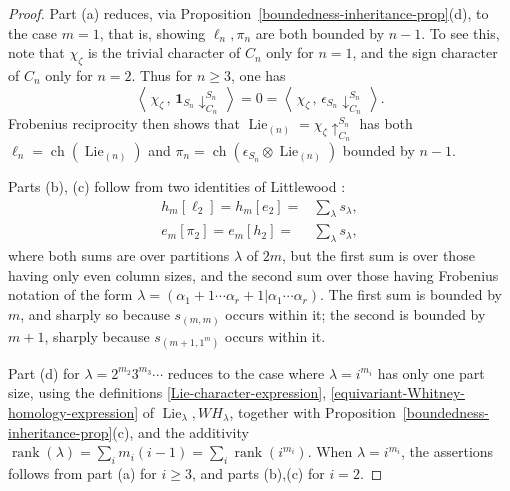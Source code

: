 \documentclass[12pt]{amsart}
\theoremstyle{plain}
\theoremstyle{definition}
\begin{document}
\begin{proof}
Part (a) reduces, via Proposition~\ref{boundedness-inheritance-prop}(d),
to the case $m=1$, that is, showing $\ell_n, \pi_n$ are both bounded by $n-1$.  
To see this, note that $\chi_\zeta$ is the trivial character of $C_n$ only for $n=1$,
and the sign character of $C_n$ only for $n=2$.
Thus for  $n \geq 3$, one has
$$
\left\langle \, \chi_\zeta \, , \, {{\mathbf{1}}}_{S_n} \downarrow^{S_n}_{C_n} \, \right\rangle
= 0 
=\left\langle \, \chi_\zeta \, , \, \epsilon_{S_n} \downarrow^{S_n}_{C_n} \, \right\rangle.
$$
Frobenius reciprocity then shows that
${{\operatorname{Lie}}}_{(n)}= \chi_\zeta \uparrow_{C_n}^{S_n}$
has both $\ell_n={{\operatorname{ch}}}({{\operatorname{Lie}}}_{(n)})$ 
and $\pi_n={{\operatorname{ch}}}(\epsilon_{S_n} \otimes {{\operatorname{Lie}}}_{(n)})$
bounded by $n-1$.

Parts (b), (c) follow from two identities of Littlewood
\cite[Exercise 7.28(c), 7.29(b)]{Stanley}:
\begin{align}
\label{first-Littlewood-plethysm}
h_m[\ell_2]=h_m[e_2]=&\sum_\lambda s_\lambda,\\
\label{second-Littlewood-plethysm}
e_m[\pi_2]=e_m[h_2]=&\sum_\lambda s_\lambda,
\end{align}
where both sums are over partitions $\lambda$ of $2m$, 
but the first sum is over those having only even column sizes,
and the second sum over those having Frobenius notation of
the form 
$\lambda=(\alpha_1+1 \cdots \alpha_r+1 |  \alpha_1 \cdots \alpha_r).$
The first sum is bounded by $m$, and sharply so because
$s_{(m,m)}$ occurs within it; the second is bounded by $m+1$, 
sharply because $s_{(m+1,1^m)}$ occurs within it.

Part (d) for 
$\lambda=2^{m_2} 3^{m_3} \cdots$ reduces to the case where 
$\lambda=i^{m_i}$ has only one part size, using the definitions 
\eqref{Lie-character-expression},  
\eqref{equivariant-Whitney-homology-expression}
of ${{\operatorname{Lie}}}_\lambda, WH_\lambda$, together with
Proposition~\ref{boundedness-inheritance-prop}(c), and the additivity 
$
{{\operatorname{rank}}}(\lambda)=\sum_{i} m_i(i-1) = \sum_i {{\operatorname{rank}}}(i^{m_i}).
$
When $\lambda=i^{m_i}$, the assertions follows from part (a) for $i \geq 3$, 
and parts (b),(c) for $i =2$.


\end{proof}
\end{document}
